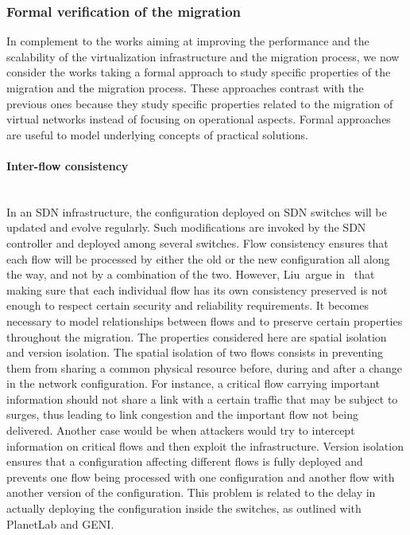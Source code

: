 \subsubsection{Formal verification of the migration}
In complement to the works aiming at improving the performance and the scalability of the virtualization infrastructure and the migration process, we now consider the works taking a formal approach to study specific properties of the migration and the migration process. These approaches contrast with the previous ones because they study specific properties related to the migration of virtual networks instead of focusing on operational aspects. Formal approaches are useful to model underlying concepts of practical solutions.

\paragraph{Inter-flow consistency}\textbf{\\}
In an SDN infrastructure, the configuration deployed on SDN switches will be updated and evolve regularly. Such modifications are invoked by the SDN controller and deployed among several switches.
Flow consistency ensures that each flow will be processed by either the old or the new configuration all along the way, and not by a combination of the two.
However, Liu~\etal argue in~\cite{Liu2015a} that making sure that each individual flow has its own consistency preserved is not enough to respect certain security and reliability requirements.
It becomes necessary to model relationships between flows and to preserve certain properties throughout the migration.
The properties considered here are spatial isolation and version isolation.
The spatial isolation of two flows consists in preventing them from sharing a common physical resource before, during and after a change in the network configuration.
For instance, a critical flow carrying important information should not share a link with a certain traffic that may be subject to surges, thus leading to link congestion and the important flow not being delivered. Another case would be when attackers would try to intercept information on critical flows and then exploit the infrastructure.
Version isolation ensures that a configuration affecting different flows is fully deployed and prevents one flow being processed with one configuration and another flow with another version of the configuration.
This problem is related to the delay in actually deploying the configuration inside the switches, as outlined with PlanetLab and GENI.
